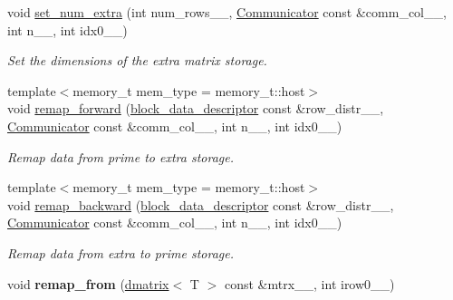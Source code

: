 \begin{DoxyCompactItemize}
\item 
void \hyperlink{classsddk_1_1matrix__storage_3_01_t_00_01matrix__storage__t_1_1slab_01_4_a51477b707dbf4ee6c8ebf3ff3bda2ad9}{set\+\_\+num\+\_\+extra} (int num\+\_\+rows\+\_\+\+\_\+, \hyperlink{classsddk_1_1_communicator}{Communicator} const \&comm\+\_\+col\+\_\+\+\_\+, int n\+\_\+\+\_\+, int idx0\+\_\+\+\_)
\begin{DoxyCompactList}\small\item\em Set the dimensions of the extra matrix storage. \end{DoxyCompactList}\item 
{\footnotesize template$<$memory\+\_\+t mem\+\_\+type = memory\+\_\+t\+::host$>$ }\\void \hyperlink{classsddk_1_1matrix__storage_3_01_t_00_01matrix__storage__t_1_1slab_01_4_ad130040b7ae7b5096b8a6b5f9d2ba1b3}{remap\+\_\+forward} (\hyperlink{structsddk_1_1block__data__descriptor}{block\+\_\+data\+\_\+descriptor} const \&row\+\_\+distr\+\_\+\+\_\+, \hyperlink{classsddk_1_1_communicator}{Communicator} const \&comm\+\_\+col\+\_\+\+\_\+, int n\+\_\+\+\_\+, int idx0\+\_\+\+\_)
\begin{DoxyCompactList}\small\item\em Remap data from prime to extra storage. \end{DoxyCompactList}\item 
{\footnotesize template$<$memory\+\_\+t mem\+\_\+type = memory\+\_\+t\+::host$>$ }\\void \hyperlink{classsddk_1_1matrix__storage_3_01_t_00_01matrix__storage__t_1_1slab_01_4_aefa313e26c0e9c4f10829cc8400bcafc}{remap\+\_\+backward} (\hyperlink{structsddk_1_1block__data__descriptor}{block\+\_\+data\+\_\+descriptor} const \&row\+\_\+distr\+\_\+\+\_\+, \hyperlink{classsddk_1_1_communicator}{Communicator} const \&comm\+\_\+col\+\_\+\+\_\+, int n\+\_\+\+\_\+, int idx0\+\_\+\+\_)
\begin{DoxyCompactList}\small\item\em Remap data from extra to prime storage. \end{DoxyCompactList}\item 
\hypertarget{classsddk_1_1matrix__storage_3_01_t_00_01matrix__storage__t_1_1slab_01_4_a345ca6f9e5fad1658aab5c54c23de2f3}{}void {\bfseries remap\+\_\+from} (\hyperlink{classsddk_1_1dmatrix}{dmatrix}$<$ T $>$ const \&mtrx\+\_\+\+\_\+, int irow0\+\_\+\+\_\+)\label{classsddk_1_1matrix__storage_3_01_t_00_01matrix__storage__t_1_1slab_01_4_a345ca6f9e5fad1658aab5c54c23de2f3}


\end{DoxyCompactItemize}
